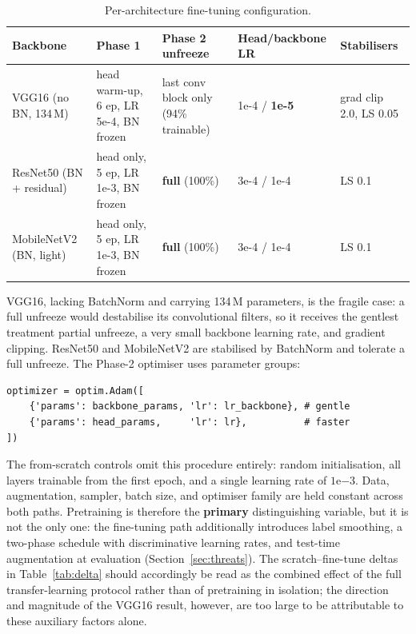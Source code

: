 \documentclass[11pt,a4paper]{article}
\numberwithin{figure}{section}
\numberwithin{table}{section}
\begin{document}
\begin{table}[H]
\centering
\caption{Per-architecture fine-tuning configuration.}
\label{tab:ftcfg}
\small
\begin{tabularx}{\textwidth}{
    >{\raggedright\arraybackslash}p{2.5cm}
    >{\raggedright\arraybackslash}p{4cm}
    >{\raggedright\arraybackslash}p{3.2cm}
    >{\centering\arraybackslash}p{2.2cm}
    >{\raggedright\arraybackslash}X
}
\toprule
Backbone & Phase 1 & Phase 2 unfreeze & Head/backbone LR & Stabilisers \\
\midrule
VGG16 (no BN, 134\,M) & head warm-up, 6 ep, LR 5e-4, BN frozen & last conv block only (94\% trainable) & 1e-4 / \textbf{1e-5} & grad clip 2.0, LS 0.05 \\
ResNet50 (BN + residual) & head only, 5 ep, LR 1e-3, BN frozen & \textbf{full} (100\%) & 3e-4 / 1e-4 & LS 0.1 \\
MobileNetV2 (BN, light) & head only, 5 ep, LR 1e-3, BN frozen & \textbf{full} (100\%) & 3e-4 / 1e-4 & LS 0.1 \\
\bottomrule
\end{tabularx}
\end{table}

VGG16, lacking BatchNorm and carrying 134\,M parameters, is the fragile case: a full unfreeze would
destabilise its convolutional filters, so it receives the gentlest treatment partial unfreeze, a very
small backbone learning rate, and gradient clipping. ResNet50 and MobileNetV2 are stabilised by
BatchNorm and tolerate a full unfreeze. The Phase-2 optimiser uses parameter groups:

\begin{lstlisting}
optimizer = optim.Adam([
    {'params': backbone_params, 'lr': lr_backbone}, # gentle
    {'params': head_params,     'lr': lr},          # faster
])
\end{lstlisting}

The from-scratch controls omit this procedure entirely: random initialisation, all layers trainable from
the first epoch, and a single learning rate of $1\mathrm{e}{-3}$. Data, augmentation, sampler, batch
size, and optimiser family are held constant across both paths. Pretraining is therefore the
\textbf{primary} distinguishing variable, but it is not the only one: the fine-tuning path additionally
introduces label smoothing, a two-phase schedule with discriminative learning rates, and test-time
augmentation at evaluation (Section~\ref{sec:threats}). The scratch--fine-tune deltas in
Table~\ref{tab:delta} should accordingly be read as the combined effect of the full transfer-learning
protocol rather than of pretraining in isolation; the direction and magnitude of the VGG16 result,
however, are too large to be attributable to these auxiliary factors alone.
\end{document}
